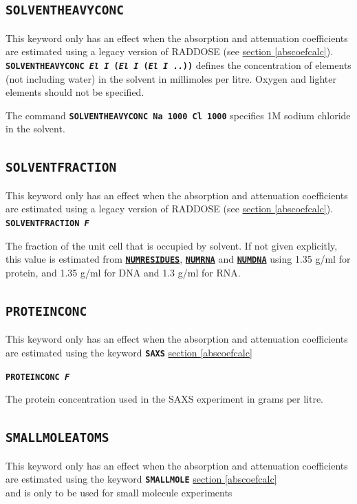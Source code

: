 \documentclass[a4paper]{article}
\newcommand{\Keyword}[1]{\texttt{\textbf{#1}}\xspace}
\newcommand{\SB}{\\[0.2em]}
\newcommand{\RDLegacyKeyword}{This keyword only has an effect when the absorption and attenuation coefficients are estimated using a legacy version of RADDOSE (see \hyperref[abscoefcalc]{section \ref*{abscoefcalc}}).\SB
}
\begin{document}
\subsection{\Keyword{SOLVENTHEAVYCONC}}
\label{solventheavyconc}
\RDLegacyKeyword

\noindent \Keyword{SOLVENTHEAVYCONC \textit{El I} (\textit{El I} (\textit{El I} ..))}
defines the concentration of elements (not including water) in the solvent in millimoles per litre. Oxygen and lighter elements should not be specified.

The command \Keyword{SOLVENTHEAVYCONC Na 1000 Cl 1000} specifies 1M sodium chloride in the solvent.


\subsection{\Keyword{SOLVENTFRACTION}}
\label{solventfraction}
\RDLegacyKeyword

\noindent \Keyword{SOLVENTFRACTION \textit{F}}

The fraction of the unit cell that is occupied by solvent. If not given explicitly, this value is estimated from \hyperref[numresidues]{\Keyword{NUMRESIDUES}}, \hyperref[numrna]{\Keyword{NUMRNA}} and \hyperref[numdna]{\Keyword{NUMDNA}} using 1.35 g/ml for protein, and 1.35 g/ml for DNA and 1.3 g/ml for RNA.


\subsection{\Keyword{PROTEINCONC}}
\label{proteinconc}
This keyword only has an effect when the absorption and attenuation coefficients are estimated using the keyword \Keyword{SAXS} \hyperref[abscoefcalc]{section \ref*{abscoefcalc}\SB}

\noindent \Keyword{PROTEINCONC \textit{F}}

The protein concentration used in the SAXS experiment in grams per litre.


\subsection{\Keyword{SMALLMOLEATOMS}}
\label{amallmoleatoms}
This keyword only has an effect when the absorption and attenuation coefficients are estimated using the keyword \Keyword{SMALLMOLE} \hyperref[abscoefcalc]{section \ref*{abscoefcalc}\SB} and is only to be used for small molecule experiments
\end{document}
